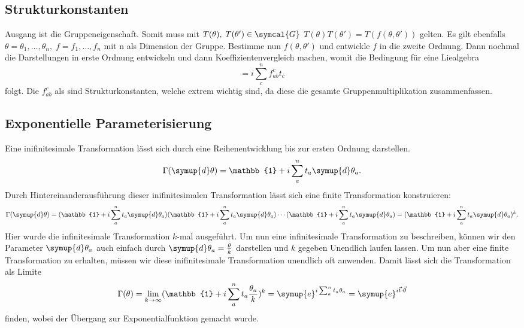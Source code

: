 \documentclass[
  captions=tableheading,  %
  titlepage=firstiscover, %
]{scrartcl}
\begin{document}
\subsection{Strukturkonstanten}
Ausgang ist die Gruppeneigenschaft. 
Somit muss mit $T(\theta), \; T(\theta') \in \symcal{G}$ $T(\theta)T(\theta') = T(f(\theta, \theta'))$ gelten.
Es gilt ebenfalls $\theta = \theta_1, \ldots, \theta_n, \; f = f_1, \ldots, f_n$ mit n als Dimension der Gruppe.
Bestimme nun $f(\theta, \theta')$ und entwickle $f$ in die zweite Ordnung.
Dann nochmal die Darstellungen in erste Ordnung entwickeln und dann Koeffizientenvergleich machen, womit 
die Bedingung für eine Liealgebra
\begin{equation*}
  [t_a, t_b] = i \sum_c^n f_{ab}^ct_c
\end{equation*}
folgt. 
Die $f_{ab}^c$ als sind Strukturkonstanten,
welche extrem wichtig sind, da diese die gesamte Gruppenmultiplikation zusammenfassen.
\subsection{Exponentielle Parameterisierung}
\label{sub:exp}
Eine inifinitesimale Transformation lässt sich durch eine Reihenentwicklung bis zur ersten Ordnung darstellen.
\begin{equation*}
  \Gamma(\symup{d}\theta) = \mathbb{1} + i \sum_a^n t_a \symup{d}\theta_a.
\end{equation*}
Durch Hintereinanderausführung dieser inifinitesimalen Transformation lässt sich eine finite 
Transformation konstruieren:
\begin{equation*}
  \Gamma(\symup{d}\theta) = (\mathbb{1} + i \sum_a^n t_a \symup{d}\theta_a)(\mathbb{1} + i \sum_a^n t_a \symup{d}\theta_a)
  \cdots (\mathbb{1} + i \sum_a^n t_a \symup{d}\theta_a)
  = (\mathbb{1} + i \sum_a^n t_a \symup{d}\theta_a)^k.
\end{equation*}
Hier wurde die infinitesimale Transformation $k$-mal ausgeführt.
Um nun eine infinitesimale Transformation zu beschreiben, können wir den Parameter 
$\symup{d}\theta_a$ auch einfach durch $\symup{d}\theta_a = \frac{\theta}{k}$ darstellen und $k$ gegeben
Unendlich laufen lassen.
Um nun aber eine finite Transformation zu erhalten, müssen wir diese inifinitesimale Transformation unendlich oft anwenden.
Damit lässt sich die Transformation als Limite
\begin{equation*}
  \Gamma(\theta) = \lim_{k \to \infty} (\mathbb{1} + i \sum_a^n t_a \frac{\theta_a}{k})^k = \symup{e}^{i\sum_a^n t_a \theta_a}
  = \symup{e}^{i\vec{t} \cdot \vec{\theta}}
\end{equation*}
finden, wobei der Übergang zur Exponentialfunktion gemacht wurde.
\end{document}
